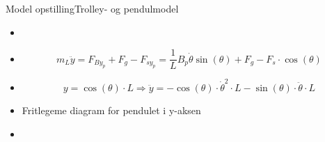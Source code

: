 \begin{frame}{Model opstilling}{Trolley- og pendulmodel}
  \begin{minipage}[t]{0.50\linewidth}
    \begin{itemize}
      	\item<1->[] {
              \begin{figure}[H]
              \centering
              \scalebox{0.75}{}
              \end{figure}}
        \item<3->[] {
     		\begin{equation*}
				m_L \ddot{y} =  F_{By_p} + F_g - F_{sy_p}  = \frac{1}{L} B_p \dot{\theta} \sin(\theta) + F_g - F_s \cdot \cos(\theta)
			\end{equation*}}
		\item<4->[] {
     		\begin{equation*}
				y = \cos(\theta) \cdot L \Rightarrow \ddot{y} = -\cos(\theta) \cdot \dot{\theta}^2 \cdot L - \sin(\theta) \cdot \ddot{\theta} \cdot L
			\end{equation*}}  	      
    \end{itemize}           
  \end{minipage}
  \begin{minipage}[t]{0.45\linewidth}
\bigskip
\bigskip 
\bigskip
	\begin{itemize}
    	\item<2->[] Fritlegeme diagram for pendulet i y-aksen  
	\end{itemize}    
\medskip 
    \begin{itemize}            
	\item<2->[] {
              \begin{figure}[H]
              \centering
              \scalebox{0.75}{}
              \end{figure}}	     	
    \end{itemize}           
  \end{minipage}
\end{frame} 


